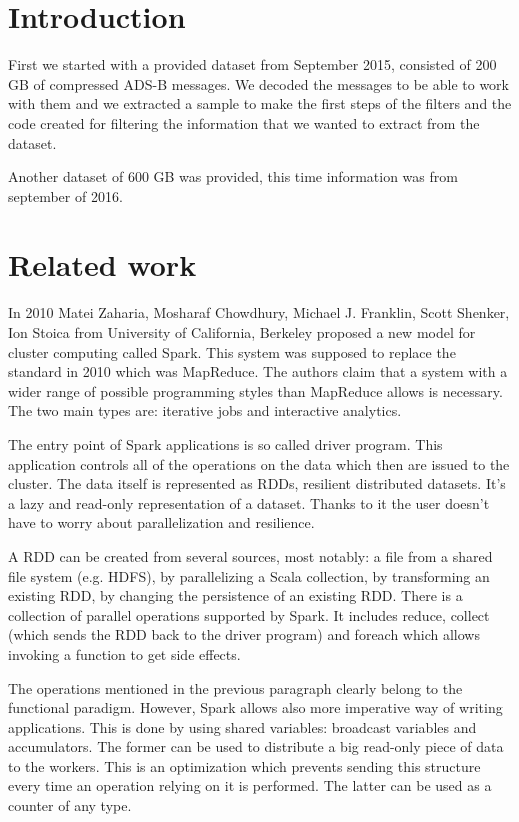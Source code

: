 \documentclass{vldb}
\begin{document}
\section{Introduction}
First we started with a provided dataset from September 2015, 
consisted of 200 GB of compressed ADS-B messages. 
We decoded the messages to be able to work with them 
and we extracted a sample to make the first steps of the filters 
and the code created for filtering the information that we wanted to extract from the dataset.

Another dataset of 600 GB was provided, this time information was from september of 2016.

\section{Related work}
In 2010 Matei Zaharia, Mosharaf Chowdhury, Michael J. Franklin, 
Scott Shenker, Ion Stoica from University of California, 
Berkeley proposed a new model for cluster computing called Spark. 
This system was supposed to replace the standard in 2010 which 
was MapReduce. The authors claim that a system with a wider range 
of possible programming styles than MapReduce allows is necessary. 
The two main types are: iterative jobs and interactive analytics.

The entry point of Spark applications is so called driver program. 
This application controls all of the operations on the data which then 
are issued to the cluster. The data itself is represented as RDDs, 
resilient distributed datasets. It’s a lazy and read-only representation 
of a dataset. Thanks to it the user doesn’t have to worry about parallelization and resilience.

A RDD can be created from several sources, most notably: 
a file from a shared file system (e.g. HDFS), by parallelizing a 
Scala collection, by transforming an existing RDD, by changing 
the persistence of an existing RDD. There is a collection of parallel 
operations supported by Spark. It includes reduce, collect (which 
sends the RDD back to the driver program) and foreach which allows 
invoking a function to get side effects.

The operations mentioned in the previous paragraph clearly belong to 
the functional paradigm. However, Spark allows also more imperative way 
of writing applications. This is done by using shared variables: broadcast 
variables and accumulators. The former can be used to distribute a big 
read-only piece of data to the workers. This is an optimization which prevents 
sending this structure every time an operation relying on it is performed. 
The latter can be used as a counter of any type.
\end{document}
